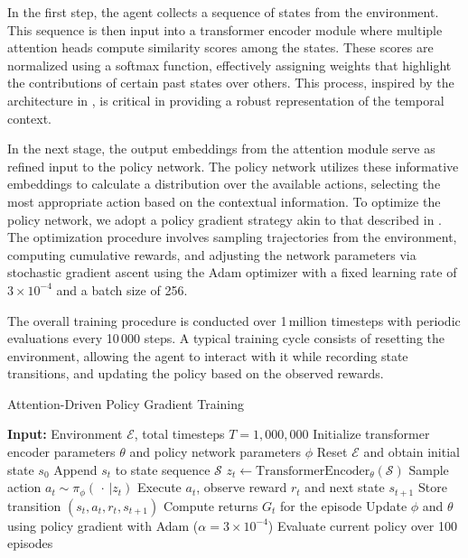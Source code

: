\documentclass{article}
\begin{document}
In the first step, the agent collects a sequence of states from the environment. This sequence is then input into a transformer encoder module where multiple attention heads compute similarity scores among the states. These scores are normalized using a softmax function, effectively assigning weights that highlight the contributions of certain past states over others. This process, inspired by the architecture in \cite{ashish_2017_attention}, is critical in providing a robust representation of the temporal context.

In the next stage, the output embeddings from the attention module serve as refined input to the policy network. The policy network utilizes these informative embeddings to calculate a distribution over the available actions, selecting the most appropriate action based on the contextual information. To optimize the policy network, we adopt a policy gradient strategy akin to that described in . The optimization procedure involves sampling trajectories from the environment, computing cumulative rewards, and adjusting the network parameters via stochastic gradient ascent using the Adam optimizer with a fixed learning rate of $3\times10^{-4}$ and a batch size of 256.

The overall training procedure is conducted over 1\,million timesteps with periodic evaluations every 10\,000 steps. A typical training cycle consists of resetting the environment, allowing the agent to interact with it while recording state transitions, and updating the policy based on the observed rewards.

\begin{algorithm}[H]
\caption{Attention-Driven Policy Gradient Training}
\begin{algorithmic}[1]
\State \textbf{Input:} Environment $\mathcal{E}$, total timesteps $T=1{,}000{,}000$
\State Initialize transformer encoder parameters $\theta$ and policy network parameters $\phi$
    \State Reset $\mathcal{E}$ and obtain initial state $s_0$
        \State Append $s_t$ to state sequence $\mathcal{S}$
        \State $z_t \leftarrow \text{TransformerEncoder}_{\theta}(\mathcal{S})$  \hfill{}
        \State Sample action $a_t \sim \pi_{\phi}(\,\cdot\,|z_t)$
        \State Execute $a_t$, observe reward $r_t$ and next state $s_{t+1}$
        \State Store transition $(s_t,a_t,r_t,s_{t+1})$
    \EndWhile
    \State Compute returns $G_t$ for the episode
    \State Update $\phi$ and $\theta$ using policy gradient with Adam ($\alpha=3\times10^{-4}$)
        \State Evaluate current policy over 100 episodes
    \EndIf
\EndFor
\end{algorithmic}
\end{algorithm}
\end{document}
